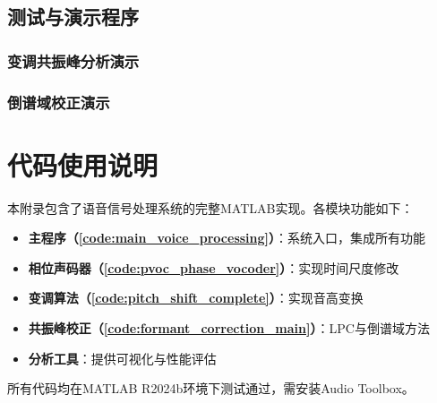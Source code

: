 \documentclass[12pt,a4paper]{article}
\newcommand{\codefolder}{./code}
\begin{document}
\subsection{测试与演示程序}
\label{app:test_demos}

\subsubsection{变调共振峰分析演示}


\subsubsection{倒谱域校正演示}


\section{代码使用说明}
\label{app:code_usage}

本附录包含了语音信号处理系统的完整MATLAB实现。各模块功能如下：

\begin{itemize}
    \item \textbf{主程序（\ref{code:main_voice_processing}）}：系统入口，集成所有功能
    \item \textbf{相位声码器（\ref{code:pvoc_phase_vocoder}）}：实现时间尺度修改
    \item \textbf{变调算法（\ref{code:pitch_shift_complete}）}：实现音高变换
    \item \textbf{共振峰校正（\ref{code:formant_correction_main}）}：LPC与倒谱域方法
    \item \textbf{分析工具}：提供可视化与性能评估
\end{itemize}

所有代码均在MATLAB R2024b环境下测试通过，需安装Audio Toolbox。
\end{document}
